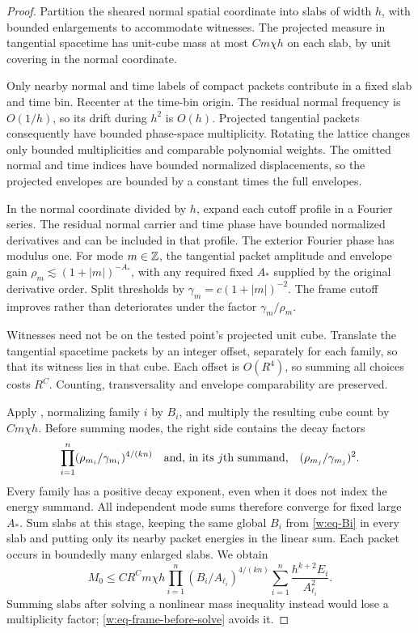 \begin{proof}
Partition the sheared normal spatial coordinate into slabs of width
$h$, with bounded enlargements to accommodate witnesses.  The projected
measure in tangential spacetime has unit-cube mass at most $Cm\chi h$
on each slab, by unit covering in the normal coordinate.

Only nearby normal and time labels of compact packets contribute in
a fixed slab and time bin.  Recenter at the time-bin origin.  The
residual normal frequency is $O(1/h)$, so its drift during $h^2$ is
$O(h)$.  Projected tangential packets consequently have bounded
phase-space multiplicity.  Rotating the lattice changes only bounded
multiplicities and comparable polynomial weights.  The omitted normal
and time indices have bounded normalized displacements, so the projected
envelopes are bounded by a constant times the full envelopes.

In the normal coordinate divided by $h$, expand each cutoff profile
in a Fourier series.  The residual normal carrier and time phase have
bounded normalized derivatives and can be included in that profile.
The exterior Fourier phase has modulus one.  For mode $m\in\mathbb Z$,
the tangential packet amplitude and envelope gain
$\rho_m\lesssim(1+|m|)^{-A_*}$, with any required fixed $A_*$ supplied
by the original derivative order.  Split thresholds by
$\gamma_m=c(1+|m|)^{-2}$.  The frame cutoff improves rather than
deteriorates under the factor $\gamma_m/\rho_m$.

Witnesses need not be on the tested point's projected unit cube.
Translate the tangential spacetime packets by an integer offset,
separately for each family, so that its witness lies in that cube.
Each offset is $O(R^4)$, so summing all choices costs $R^C$.
Counting, transversality and envelope comparability are preserved.

Apply , normalizing family $i$ by $B_i$, and multiply
the resulting cube count by $Cm\chi h$.  Before summing modes, the
right side contains the decay factors
\[
 \prod_{i=1}^n(\rho_{m_i}/\gamma_{m_i})^{4/(kn)}
 \quad\hbox{and, in its $j$th summand,}
 \quad(\rho_{m_j}/\gamma_{m_j})^2.
\]
Every family has a positive decay exponent, even when it does not
index the energy summand.  All independent mode sums therefore
converge for fixed large $A_*$.  Sum slabs at this stage, keeping the
same global $B_i$ from \eqref{w:eq-Bi} in every slab and putting only
its nearby packet energies in the linear sum.  Each packet occurs in
boundedly many enlarged slabs.  We obtain
\begin{equation}\label{w:eq-frame-before-solve}
 M_0\leq CR^C m\chi h
 \prod_{i=1}^n(B_i/A_{\ell_i})^{4/(kn)}
 \sum_{i=1}^n\frac{h^{k+2}E_i}{A_{\ell_i}^2}.
\end{equation}
Summing slabs after solving a nonlinear mass inequality instead would
lose a multiplicity factor; \eqref{w:eq-frame-before-solve} avoids it.


\end{proof}
